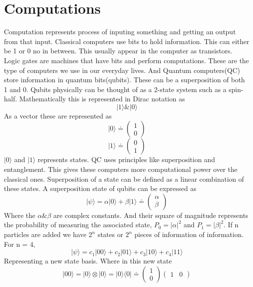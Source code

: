 \documentclass[12pt, a4paper]{Assignment}
\begin{document}
\section{Computations}
Computation represents process of inputing something and getting an output from that input.
Classical computers use bits to hold information.
This can either be 1 or 0 no in between.
This usually appear in the computer as transistors.
Logic gates are machines that have bits and perform computations.\cite{deutsch1985quantum}
These are the type of computers we use in our everyday lives.
And Quantum computers(QC) store information in quantum bits(qubits).
These can be a superposition of both 1 and 0.
Qubits physically can be thought of as a 2-state system such as a spin-half.
Mathematically this is represented in Dirac notation as $$|1\rangle \& |0\rangle$$
As a vector these are represented as $$|0\rangle \doteq \begin{pmatrix}
	1\\0
\end{pmatrix}$$
$$|1\rangle \doteq \begin{pmatrix}
	0\\1
\end{pmatrix}$$
$|0\rangle$ and $|1\rangle$ represents states.
QC uses principles like superposition and entanglement.
This gives these computers more computational power over the classical ones.
Superposition of a state can be defined as a linear combination of these states.\cite{mcintyre_quantum_2012}
A superposition state of qubits can be expressed as \begin{equation}
|\psi\rangle = \alpha|0\rangle + \beta|1\rangle \doteq \begin{pmatrix}
	\alpha\\\beta
\end{pmatrix} \end{equation}
Where the $\alpha \& \beta$ are complex constants.
And their square of magnitude represents the probability of measuring the associated state, $P_{0}=|\alpha|^2$ and $P_{1}=|\beta|^2$. 
If n particles are added we have $2^n$ states or $2^n$ pieces of information of information. 
For n = 4,
\begin{equation}
	|\psi\rangle =c_1 |00\rangle+c_2 |01\rangle+c_3 |10\rangle+ c_4 |11\rangle
\end{equation}
Representing a new state basis. 
Where in this new state \begin{equation}|00\rangle = |0\rangle\otimes|0\rangle =|0\rangle\langle 0| \doteq
	\begin{pmatrix}
		1\\0
	\end{pmatrix} \begin{pmatrix}
		1&0
\end{pmatrix}\end{equation}
\end{document}
